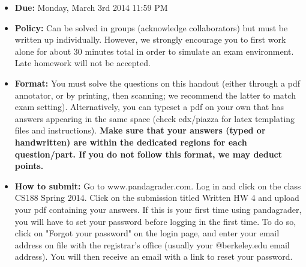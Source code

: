 \begin{itemize}
\item \textbf{Due:} Monday, March 3rd 2014 11:59 PM
\item \textbf{Policy:} Can be solved in groups (acknowledge collaborators) but must
be written up individually. However,
we strongly encourage you to first work alone for about 30 minutes total in order to simulate an exam environment.  Late homework
will not be accepted.
\item \textbf{Format:}
You must solve the questions on this handout (either through a pdf annotator, or by printing, then scanning; we recommend the latter to match exam setting). Alternatively, you can typeset a pdf on your own that has answers appearing in the same space (check edx/piazza for latex templating files and instructions).
\textbf{Make sure that your answers (typed or handwritten) are within the
dedicated regions for each question/part.  If you do not follow this format, we may deduct points.}

\item \textbf{How to submit:}  Go to www.pandagrader.com. Log in and click on the
class CS188 Spring 2014. Click
on the submission titled Written HW 4 and upload your pdf containing your answers. If this is your first time using
pandagrader, you will have to set your password before logging in the
first time.  To do so, click on "Forgot your password" on the login
page, and enter your email address on file with the registrar's office
(usually your @berkeley.edu email address). You will then receive an
email with a link to reset your password.

\end{itemize}


